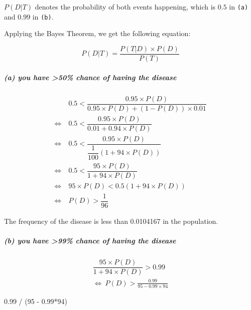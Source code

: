 \documentclass[
]{article}
\newenvironment{Shaded}{\begin{snugshade}}{\end{snugshade}}
\newcommand{\DecValTok}[1]{\textcolor[rgb]{0.00,0.00,0.81}{#1}}
\newcommand{\FloatTok}[1]{\textcolor[rgb]{0.00,0.00,0.81}{#1}}
\newcommand{\NormalTok}[1]{#1}
\newcommand{\SpecialCharTok}[1]{\textcolor[rgb]{0.00,0.00,0.00}{#1}}
\begin{document}
\(P(D|T)\) denotes the probability of both events happening, which is
\(0.5\) in \texttt{(a)} and \(0.99\) in \texttt{(b)}.

Applying the Bayes Theorem, we get the following equation:

\[
P(D|T) = \frac{P(T|D)\times{P(D)}}{P(T)}
\]

\hypertarget{a-you-have-50-chance-of-having-the-disease}{%
\subparagraph{(a) you have \textgreater50\% chance of having the
disease}\label{a-you-have-50-chance-of-having-the-disease}}

\[
\begin{align}
&0.5 < \dfrac{0.95\times P\left( D\right) }{0.95\times P\left( D\right) +\left( 1-P\left( D\right) \right) \times 0.01} \\
\Leftrightarrow\ &0.5 < \dfrac{0.95\times P\left( D\right) }{0.01+0.94\times P\left( D\right) } \\
\Leftrightarrow \ &0.5 < \dfrac{0.95\times P\left( D\right) }{\dfrac{1}{100}\left( 1+94\times P\left( D\right) \right) } \\
\Leftrightarrow \  &0.5 < \dfrac{95\times P\left( D\right) }{1+94\times P\left( D\right) } \\ 
\Leftrightarrow\  &95\times P\left( D\right) < 0.5\left( 1+94\times P\left( D\right) \right) \\
\Leftrightarrow\ &P\left( D\right) > \dfrac{1}{96} 
\end{align}
\]

The frequency of the disease is less than 0.0104167 in the population.

\hypertarget{b-you-have-99-chance-of-having-the-disease}{%
\subparagraph{(b) you have \textgreater99\% chance of having the
disease}\label{b-you-have-99-chance-of-having-the-disease}}

\[
\begin{align}
\dfrac{95\times P\left( D\right) }{1+94\times P\left( D\right) } > 0.99 \\
\Leftrightarrow\ P(D) > \frac{0.99}{95 - 0.99 \times {94}}
\end{align}
\]

\begin{Shaded}
\begin{Highlighting}[]
\FloatTok{0.99} \SpecialCharTok{/}\NormalTok{ (}\DecValTok{95} \SpecialCharTok{{-}} \FloatTok{0.99}\SpecialCharTok{*}\DecValTok{94}\NormalTok{)}
\end{Highlighting}
\end{Shaded}
\end{document}
